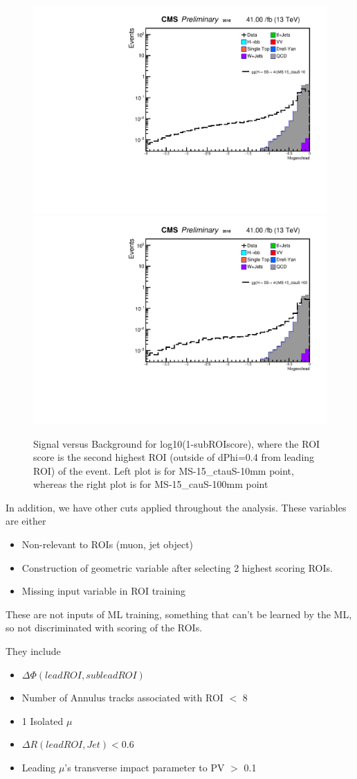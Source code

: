  \begin{figure}[h!]
   \caption{Signal versus Background for log10(1-subROIscore), where the ROI score is the second highest ROI (outside of dPhi=0.4 from leading ROI) of the event. Left plot is for MS-15\_ctauS-10mm point, whereas the right plot is for MS-15\_cauS-100mm point}
   \label{fig:excROIscore}
   \centering
   \includegraphics[width=0.47\linewidth]{figs/AnalysisNoteplot_MS-15_ctauS-10_hlogexclead.pdf}
   \includegraphics[width=0.47\linewidth]{figs/AnalysisNoteplot_MS-15_ctauS-100_hlogexclead.pdf}
 \end{figure}


In addition, we have other cuts applied throughout the analysis.
These variables are either
\begin{itemize}
 \item Non-relevant to ROIs (muon, jet object)
 \item Construction of geometric variable after selecting 2 highest scoring ROIs.
 \item Missing input variable in ROI training
\end{itemize}
These are not inputs of ML training, something that can't be learned by the ML, so not discriminated with scoring of the ROIs.

They include 
\begin{itemize}
  \item $\Delta\Phi(lead ROI,sublead ROI)$ 
  \item Number of Annulus tracks associated with ROI $<$ 8
  \item 1 Isolated $\mu$
  \item $\Delta R(lead ROI, Jet)<$0.6 
  \item Leading $\mu$'s transverse impact parameter to PV $>$ 0.1
\end{itemize}

